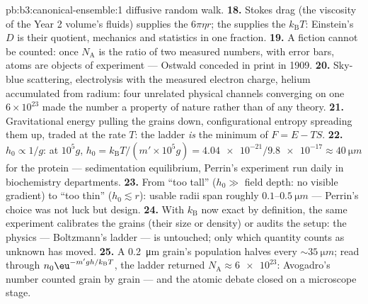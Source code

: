 \begin{solution}{pb:b3:canonical-ensemble:1}
diffusive random walk.
\textbf{18.} Stokes drag (the viscosity of the Year 2 volume's
fluids) supplies the $6\pi\eta r$; the  supplies
the $k_{\text{B}}T$: Einstein's $D$ is their quotient, mechanics
and statistics in one fraction.
\textbf{19.} A fiction cannot be counted: once $N_{\text{A}}$ is
the ratio of two measured numbers, with error bars, atoms are
objects of experiment --- Ostwald conceded in print in 1909.
\textbf{20.} Sky-blue scattering, electrolysis with the measured
electron charge, helium accumulated from radium: four unrelated
physical channels converging on one $6\times10^{23}$ made the
number a property of nature rather than of any theory.
\textbf{21.} Gravitational energy pulling the grains down,
configurational entropy spreading them up, traded at the rate $T$:
the ladder \emph{is} the minimum of $F = E - TS$.
\textbf{22.} $h_0 \propto 1/g$: at $10^5g$,
$h_0 = k_{\text{B}}T/(m'\times10^5g) = \num{4.04e-21}/
\num{9.8e-17} \approx \qty{40}{\micro m}$ for the protein ---
sedimentation equilibrium, Perrin's experiment run daily in
biochemistry departments.
\textbf{23.} From ``too tall'' ($h_0 \gg$ field depth: no visible
gradient) to ``too thin'' ($h_0 \lesssim r$): usable radii span
roughly $0.1$--$\qty{0.5}{\micro m}$ --- Perrin's choice was not
luck but design.
\textbf{24.} With $k_{\text{B}}$ now exact by definition, the
same experiment calibrates the grains (their size or density) or
audits the setup: the physics --- Boltzmann's ladder --- is
untouched; only which quantity counts as unknown has moved.
\textbf{25.} A \qty{0.2}{\micro m} grain's population halves every
$\sim\qty{35}{\micro m}$; read through $n_0\eu^{-m'gh/k_{\text{B}}
T}$, the ladder returned $N_{\text{A}} \approx \num{6e23}$:
Avogadro's number counted grain by grain --- and the atomic
debate closed on a microscope stage.
\end{solution}
